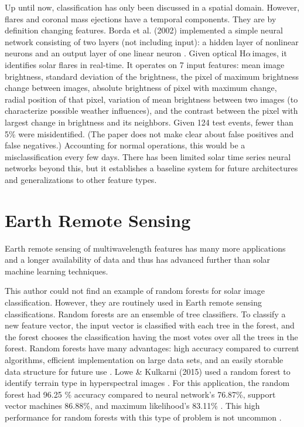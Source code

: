 \documentclass[twoside]{report}
\newcommand{\halpha}{H$\alpha$\,}
\begin{document}
Up until now, classification has only been discussed in a spatial domain. However, flares and coronal mass ejections have a temporal components. They are by definition changing features. Borda et al. (2002) implemented a simple neural network consisting of two layers (not including input): a hidden layer of nonlinear neurons and
an output layer of one linear neuron \cite{borda2002automatic}. Given optical \halpha images, it identifies solar flares in real-time. It operates on 7 input features: mean image brightness, standard deviation of the brightness, the pixel of maximum brightness change between images, absolute brightness of pixel with maximum change, radial position of that pixel, variation of mean brightness between two images (to characterize possible weather influences), and the contrast between the pixel with largest change in brightness and its neighbors. Given 124 test events, fewer than 5\% were misidentified. (The paper does not make clear about false positives and false negatives.) Accounting for normal operations, this would be a misclassification every few days. There has been limited solar time series neural networks beyond this, but it establishes a baseline system for future architectures and generalizations to other feature types.

\section{Earth Remote Sensing}
Earth remote sensing of multiwavelength features has many more applications and a longer availability of data and thus has advanced further than solar machine learning techniques. 

This author could not find an example of random forests for solar image classification. However, they are routinely used in Earth remote sensing classifications. Random forests are an ensemble of tree classifiers. To classify a new feature vector, the input vector is classified with each tree in the forest, and the forest chooses the classification having the most votes over all the trees in the forest. Random forests have many advantages: high accuracy compared to current algorithms, efficient implementation on large data
sets, and an easily storable data structure for future use \cite{ghose2010decision}. Lowe \& Kulkarni (2015) used a random forest to identify terrain type in hyperspectral images \cite{lowe:2015}. For this application, the random forest had 96.25 \% accuracy compared to neural network's 76.87\%, support vector machines 86.88\%, and maximum likelihood's 83.11\% \cite{lowe:2015}. This high performance for random forests with this type of problem is not uncommon \cite{puissant2014object, salas2016multispectral, clark2016mapping, kulkarni2017multispectral}.
\end{document}
